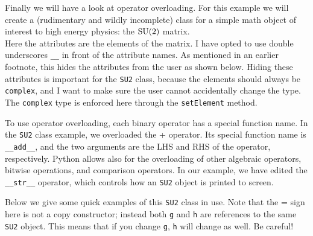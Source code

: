 



Finally we will have a look at operator overloading. For this example we
will create a (rudimentary and wildly incomplete) class for a simple math 
object of interest to high energy physics: the $\operatorname{SU}(2)$ matrix.\\



Here the attributes are the elements of the matrix. 
I have opted to use double underscores \texttt{\_\_} in front of
the attribute names. As mentioned in an earlier footnote, this hides the
attributes from the user as shown below.
Hiding these attributes is important for the \texttt{SU2} class, because the
elements should always be \texttt{complex}, and I want to make sure the
user cannot accidentally change the type. The \texttt{complex} type is
enforced here through the \texttt{setElement} method.




To use operator overloading, each binary operator has a special function name.
In the \texttt{SU2} class example, we overloaded the + operator. Its special
function name is \texttt{\_\_add\_\_}, and the two arguments are the LHS and
RHS of the operator, respectively. Python allows also for the overloading
of other algebraic operators, bitwise operations, and comparison operators.
In our example, we have edited the \texttt{\_\_str\_\_} operator, which
controls how an \texttt{SU2} object is printed to screen.

Below we give some quick examples of this \texttt{SU2} class in use. Note that
the = sign here is not a copy constructor; instead both \texttt{g} and
\texttt{h} are references to the same \texttt{SU2} object. This means that
if you change \texttt{g}, \texttt{h} will change as well. Be careful!\\ 







